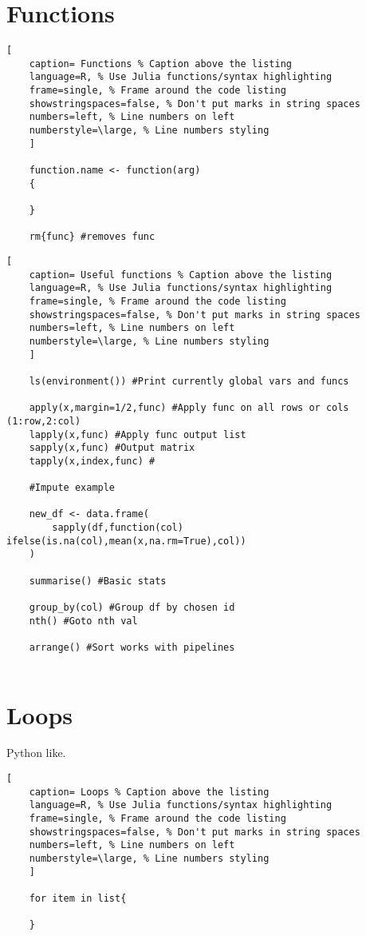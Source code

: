 \documentclass[11pt]{scrartcl} %
\begin{document}
\section{Functions}

\begin{lstlisting}[
	caption= Functions % Caption above the listing
	language=R, % Use Julia functions/syntax highlighting
	frame=single, % Frame around the code listing
	showstringspaces=false, % Don't put marks in string spaces
	numbers=left, % Line numbers on left
	numberstyle=\large, % Line numbers styling
	]

	function.name <- function(arg)
	{

	}
	
	rm{func} #removes func

\end{lstlisting}

\begin{lstlisting}[
	caption= Useful functions % Caption above the listing
	language=R, % Use Julia functions/syntax highlighting
	frame=single, % Frame around the code listing
	showstringspaces=false, % Don't put marks in string spaces
	numbers=left, % Line numbers on left
	numberstyle=\large, % Line numbers styling
	]

	ls(environment()) #Print currently global vars and funcs	

	apply(x,margin=1/2,func) #Apply func on all rows or cols (1:row,2:col)
	lapply(x,func) #Apply func output list
	sapply(x,func) #Output matrix
	tapply(x,index,func) #

	#Impute example

	new_df <- data.frame(
		sapply(df,function(col) ifelse(is.na(col),mean(x,na.rm=True),col))
	)

	summarise() #Basic stats

	group_by(col) #Group df by chosen id
	nth() #Goto nth val
	
	arrange() #Sort works with pipelines
	
\end{lstlisting}

\section{Loops}

Python like.

\begin{lstlisting}[
	caption= Loops % Caption above the listing
	language=R, % Use Julia functions/syntax highlighting
	frame=single, % Frame around the code listing
	showstringspaces=false, % Don't put marks in string spaces
	numbers=left, % Line numbers on left
	numberstyle=\large, % Line numbers styling
	]

	for item in list{

	}
		
\end{lstlisting}
\end{document}

